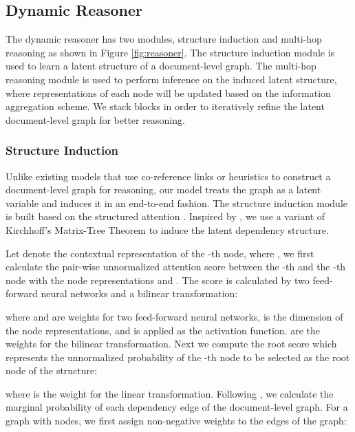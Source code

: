 \documentclass[11pt,a4paper]{article}
\begin{document}
\subsection{Dynamic Reasoner}
\label{ssec:3.2}
The dynamic reasoner has two modules, structure induction and multi-hop reasoning as shown in Figure \ref{fig:reasoner}. The structure induction module is used to learn a latent structure of a document-level graph. The multi-hop reasoning module is used to perform inference on the induced latent structure, where representations of each node will be updated based on the information aggregation scheme. We stack  blocks in order to iteratively refine the latent document-level graph for better reasoning.

\subsubsection{Structure Induction}
\label{ssec:3.2.1}
Unlike existing models that use co-reference links \citep{Sahu2019IntersentenceRE} or heuristics \citep{christopoulou2019connecting} to construct a document-level graph for reasoning, our model treats the graph as a latent variable and induces it in an end-to-end fashion. The structure induction module is built based on the structured attention \citep{Kim2017StructuredAN, Liu2017LearningST}. Inspired by \citet{Liu2017LearningST}, we use a variant of Kirchhoff's Matrix-Tree Theorem \citep{tutte1984graph, Koo2007StructuredPM} to induce the latent dependency structure. 

Let  denote the contextual representation of the -th node, where , we first calculate the pair-wise unnormalized attention score  between the -th and the -th node with the node representations  and . The score  is calculated by two feed-forward neural networks and a bilinear transformation:

where    and    are weights for two feed-forward neural networks,  is the dimension of the node representations, and  is applied as the activation function.     are the weights for the bilinear transformation. Next we compute the root score  which represents the unnormalized probability of the -th node to be selected as the root node of the structure: 

where    is the weight for the linear transformation. Following \citet{Koo2007StructuredPM}, we calculate the marginal probability of each dependency edge of the document-level graph. For a graph  with  nodes, we first assign non-negative weights    to the edges of the graph: 
\end{document}
